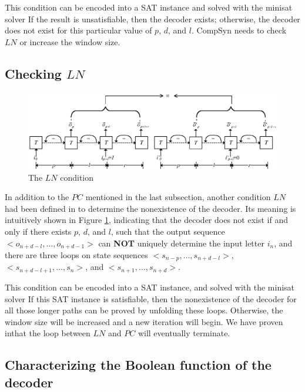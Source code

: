 \documentclass[runningheads,a4paper]{llncs}
\begin{document}
This condition can be encoded into a SAT instance and solved with the minisat solver 
If the result is unsatisfiable,
then the decoder exists;
otherwise,
the decoder does not exist for this particular value of $p$, $d$, and $l$.
CompSyn needs to check $LN$ or increase the window size.

\subsection{Checking $LN$}
\begin{figure}[t]
\begin{center}
\includegraphics[width=\textwidth]{ln}
\end{center}
\caption{The $LN$ condition}
  \label{fig_ln}
\end{figure}

In addition to the $PC$ mentioned in the last subsection,
another condition $LN$ had been defined in to determine the nonexistence of the decoder.
Its meaning is intuitively shown in Figure \ref{fig_ln},
indicating that the decoder does not exist if and only if there exists $p$, $d$, and $l$,
such that the output sequence $<o_{n+d-l},\dots,o_{n+d-1}>$ can \textbf{NOT} uniquely determine the input letter $i_n$,
and there are three loops on state sequences $<s_{n-p},\dots,s_{n+d-l}>$,$<s_{n+d-l+1},\dots,s_n>$, and $<s_{n+1},\dots,s_{n+d}>$.

This condition can be encoded into a SAT instance,
and solved with the minisat solver 
If this SAT instance is satisfiable,
then the nonexistence of the decoder for all those longer paths can be proved by unfolding these loops.
Otherwise,
the window size will be increased and a new iteration will begin.
We have proven inthat the loop between $LN$ and $PC$ will eventually terminate.



\subsection{Characterizing the Boolean function of the decoder}
\end{document}
